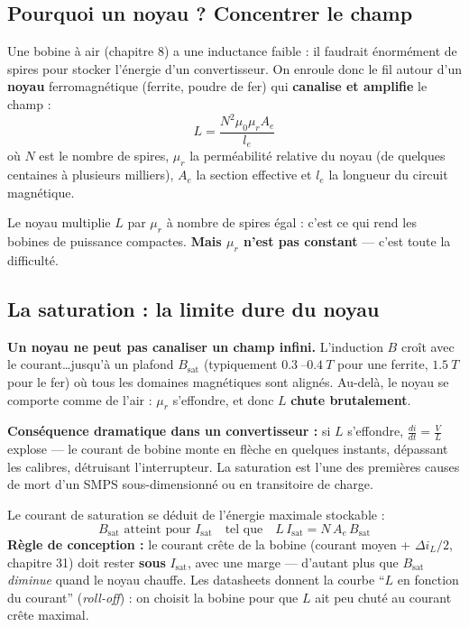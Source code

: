 \documentclass[12pt,a4paper,twoside]{book}
\begin{document}
\subsection{Pourquoi un noyau ? Concentrer le champ}

\begin{formule}
Une bobine à air (chapitre 8) a une inductance faible : il faudrait énormément de spires pour stocker l'énergie d'un convertisseur. On enroule donc le fil autour d'un \textbf{noyau} ferromagnétique (ferrite, poudre de fer) qui \textbf{canalise et amplifie} le champ :
\[
L = \frac{N^2 \mu_0 \mu_r A_e}{l_e}
\]
où $N$ est le nombre de spires, $\mu_r$ la perméabilité relative du noyau (de quelques centaines à plusieurs milliers), $A_e$ la section effective et $l_e$ la longueur du circuit magnétique.

Le noyau multiplie $L$ par $\mu_r$ à nombre de spires égal : c'est ce qui rend les bobines de puissance compactes. \textbf{Mais $\mu_r$ n'est pas constant} --- c'est toute la difficulté.
\end{formule}

\subsection{La saturation : la limite dure du noyau}

\begin{attention}
\textbf{Un noyau ne peut pas canaliser un champ infini.} L'induction $B$ croît avec le courant\ldots jusqu'à un plafond $B_{\text{sat}}$ (typiquement $\SI{0.3}{}$--$\SI{0.4}{T}$ pour une ferrite, $\SI{1.5}{T}$ pour le fer) où tous les domaines magnétiques sont alignés. Au-delà, le noyau se comporte comme de l'air : $\mu_r$ s'effondre, et donc $L$ \textbf{chute brutalement}.

\textbf{Conséquence dramatique dans un convertisseur :} si $L$ s'effondre, $\frac{di}{dt} = \frac{V}{L}$ explose --- le courant de bobine monte en flèche en quelques instants, dépassant les calibres, détruisant l'interrupteur. La saturation est l'une des premières causes de mort d'un SMPS sous-dimensionné ou en transitoire de charge.
\end{attention}

\begin{formule}
Le courant de saturation se déduit de l'énergie maximale stockable :
\[
B_{\text{sat}} \text{ atteint pour } I_{\text{sat}} \quad\text{tel que}\quad L\,I_{\text{sat}} = N\,A_e\,B_{\text{sat}}
\]
\textbf{Règle de conception :} le courant crête de la bobine (courant moyen + $\Delta i_L/2$, chapitre 31) doit rester \textbf{sous} $I_{\text{sat}}$, avec une marge --- d'autant plus que $B_{\text{sat}}$ \textit{diminue} quand le noyau chauffe. Les datasheets donnent la courbe ``$L$ en fonction du courant'' (\textit{roll-off}) : on choisit la bobine pour que $L$ ait peu chuté au courant crête maximal.
\end{formule}
\end{document}
